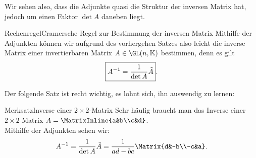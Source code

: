 Wir sehen also, dass die Adjunkte quasi die Struktur der inversen Matrix hat, jedoch um einen Faktor $\det A$ daneben liegt.
\begin{Satz}
{Rechenregel}{Cramersche Regel zur Bestimmung der inversen Matrix}
Mithilfe der Adjunkten können wir aufgrund des vorhergehen Satzes also leicht die inverse Matrix einer invertierbaren Matrix $A\in\GL(n,\mathbb{K})$ bestimmen, denn es gilt
\begin{equation}
    \boxed{A^{-1}=\frac{1}{\det A}\Tilde{A}}.
\end{equation}
\end{Satz}
Der folgende Satz ist recht wichtig, es lohnt sich, ihn auswendig zu lernen:
\begin{Satz}
{Merksatz}{Inverse einer $2\times2$-Matrix}
Sehr häufig braucht man das Inverse einer $2\times2$-Matrix $A=\MatrixInline{a&b\\c&d}$.\\
Mithilfe der Adjunkten sehen wir:
\begin{equation}
    \label{eq:01InverseZweiKreuzZwei}A^{-1}=\frac{1}{\det A}\Tilde{A}=\frac{1}{ad-bc}\Matrix{d&-b\\-c&a}.
\end{equation}
\end{Satz}


